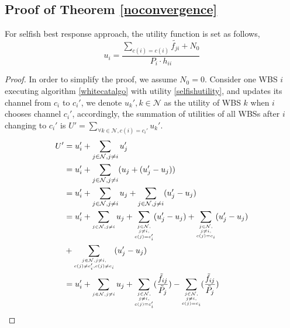 \backmatter
\begin{appendices}
\chapter{Proof of Theorem \ref{noconvergence}}
\label{proof}
For selfish best response approach, the utility function is set as follows,
	\begin{equation}
\label{selfishutility}
		u_i=\frac{\sum_{c(i)=c(i)} \tilde{f_{ji}}+N_0}{P_i\cdot h_{ii}}
	\end{equation}

\begin{proof}
In order to simplify the proof, we assume $N_0=0$.
Consider one WBS $i$ executing algorithm \ref{whitecatalgo} with utility \ref{selfishutility}, and updates its channel from $c_i$ to $c_i'$, we denote $u_k', k\in \mathcal{N}$ as the utility of WBS $k$ when $i$ chooses channel $c_i'$, accordingly, the summation of utilities of all WBSs after $i$ changing to $c_i'$ is $U'=\sum_{\forall k\in \mathcal{N}, c(i)=c_i'}u_k'$.
\begin{equation}
\label{xxx}
\begin{split}	
U'
& =u_i' + \sum\limits_{j\in\mathcal{N},j\neq i}u_j'\\
& =u_i' + \sum\limits_{j\in\mathcal{N},j\neq i}(u_j+(u_j'-u_j))\\
& =u_i' + \sum\limits_{j\in\mathcal{N},j\neq i}u_j+\sum\limits_{j\in\mathcal{N},j\neq i}(u_j'-u_j)\\
& =u_i' + \sum\limits_{\tiny\substack{j\in\mathcal{N},j\neq i}}u_j + \sum\limits_{\tiny\substack{j\in\mathcal{N},\\j\neq i, \\c(j)=c_i'}}(u_j'-u_j) + \sum\limits_{\tiny\substack{j\in\mathcal{N},\\j\neq i, \\c(j)=c_i}}(u_j'-u_j)\\
&  + \sum\limits_{\tiny\substack{j\in\mathcal{N},j\neq i, \\c(j)\neq c_i', c(j)\neq c_i}}(u_j'-u_j)\\
& =u_i' + \sum\limits_{\tiny\substack{j\in\mathcal{N},j\neq i}}u_j + \sum\limits_{\tiny\substack{j\in\mathcal{N},\\j\neq i, \\c(j)=c_i'}}(\dfrac{\tilde f_{ij}}{\tilde P_j}) - \sum\limits_{\tiny\substack{j\in\mathcal{N},\\j\neq i, \\c(j)=c_i}}(\dfrac{\tilde f_{ij}}{\tilde P_j})\\
\end{split}
\end{equation}


\end{proof}
\end{appendices}
